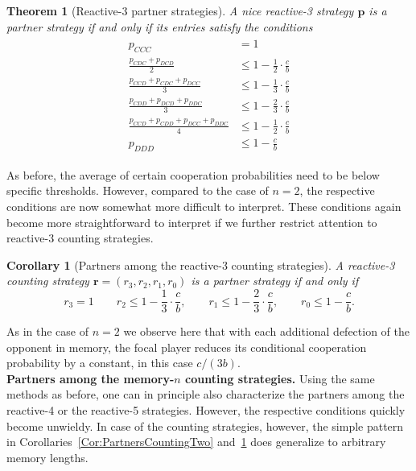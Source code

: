 \documentclass[11pt]{article}
\theoremstyle{plainCl1}
\newtheorem{theorem}{Theorem}
\newtheorem{corollary}{Corollary}
\theoremstyle{plainCl2}
\begin{document}
\begin{theorem}[Reactive-3 partner strategies]\label{theorem:reactive_three_partner_strategies}
A nice reactive-3 strategy $\mathbf{p}$ is a partner strategy if and only if its entries satisfy the conditions
\begin{align}\label{eq:three_bit_conditions}
  \begin{split}
  p_{CCC} & = 1 \\
  \frac{p_{CDC} + p_{DCD}}{2} & \leq 1 - \frac{1}{2} \cdot \frac{c}{b} \\
  \frac{p_{CCD} + p_{CDC} + p_{DCC}}{3} & \leq 1 - \frac{1}{3} \cdot \frac{c}{b} \\
  \frac{p_{CDD} + p_{DCD} + p_{DDC}}{3} & \leq 1 - \frac{2}{3} \cdot \frac{c}{b} \\
  \frac{p_{CCD} + p_{CDD} + p_{DCC} + p_{DDC}}{4}  & \leq 1 - \frac{1}{2} \cdot \frac{c}{b}  \\
  p_{DDD} & \leq 1\!-\! \frac{c}{b}
  \end{split}
\end{align}
\end{theorem}

\noindent
As before, the average of certain cooperation probabilities need to be below specific thresholds. 
However, compared to the case of $n\!=\!2$, the respective conditions are now somewhat more difficult to interpret. 
These conditions again become more straightforward to interpret if we further restrict attention to reactive-3 counting strategies. 

\begin{corollary}[Partners among the reactive-3 counting strategies]
\label{Cor:PartnersCountingThree}
A reactive-3 counting strategy $\mathbf{r} \!=\! (r_3, r_2, r_1, r_0)$ is a partner strategy if and only if
\begin{equation}\label{eq:counting_three_bit_conditions}
  \displaystyle r_3 \!=\! 1 \qquad r_2 \le 1\!-\! \frac{1}{3} \cdot \frac{c}{b}, \qquad r_1 \le 1\!-\! \frac{2}{3} \cdot \frac{c}{b}, \qquad  r_0 \le 1\!-\! \frac{c}{b}.
\end{equation}
\end{corollary}

\noindent
As in the case of $n\!=\!2$ we observe here that with each additional defection of the opponent in memory, the focal player reduces its conditional cooperation probability by a constant, in this case $c/(3b)$.\\

\noindent
{\bf Partners among the memory-$n$ counting strategies.}
Using the same methods as before, one can in principle also characterize the partners among the reactive-4 or the reactive-5 strategies. However, the  respective conditions quickly become unwieldy. 
In case of the counting strategies, however, the simple pattern in Corollaries~\ref{Cor:PartnersCountingTwo} and~\ref{Cor:PartnersCountingThree} does generalize to arbitrary memory lengths. 
\end{document}

